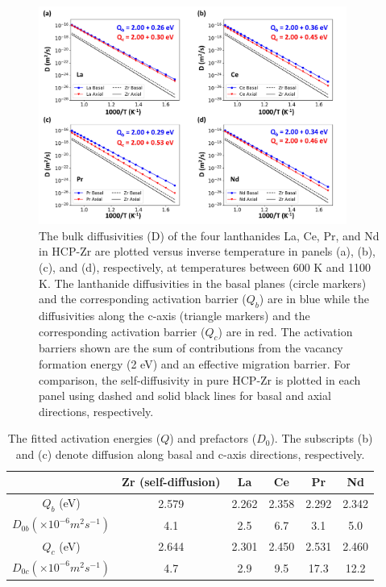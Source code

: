 \documentclass[preprint,12pt]{elsarticle}
\begin{document}
\begin{figure}[h!]
    \centering
    \includegraphics[width=0.9\textwidth]{5_diffusivities_Q_updated_added_f0.jpg}
    \caption{The bulk diffusivities (D) of the four lanthanides La, Ce, Pr, and Nd in HCP-Zr are plotted versus inverse temperature in panels (a), (b), (c), and (d), respectively, at temperatures between 600 K and 1100 K. The lanthanide diffusivities in the basal planes (circle markers) and the corresponding activation barrier ($Q_b$) are in blue while the diffusivities along the c-axis (triangle markers) and the corresponding activation barrier ($Q_c$) are in red. The activation barriers shown are the sum of contributions from the vacancy formation energy (2 eV) and an effective migration barrier. For comparison, the self-diffusivity in pure HCP-Zr is plotted in each panel using dashed and solid black lines for basal and axial directions, respectively.}
    \label{fig:diffusivities_ln}
\end{figure}

\begin{table}[h!]
    \centering
    \caption{The fitted activation energies ($Q$) and prefactors ($D_0$). The subscripts (b) and (c) denote diffusion along basal and c-axis directions, respectively.}
    \label{tab:arrhenius_fit}
    \begin{tabular}{c|c|c|c|c|c}
    \toprule
       & Zr (self-diffusion) & La & Ce & Pr & Nd  \\
       \hline
      $Q_b$ (eV) & 2.579 &2.262 &2.358 & 2.292  & 2.342 \\
      $D_{0b} (\times10^{-6} m^2s^{-1})$ & 4.1 & 2.5 & 6.7 & 3.1  &5.0 \\
      \hline
      $Q_c$ (eV) & 2.644 &2.301 &2.450 &2.531   &2.460 \\
      $D_{0c}  (\times10^{-6} m^2s^{-1})$  &4.7 &2.9 &9.5 & 17.3  &12.2 \\
      \bottomrule
    \end{tabular}
\end{table}
\end{document}
